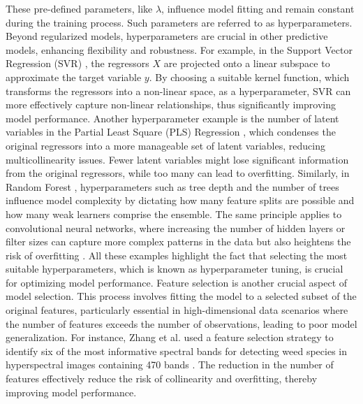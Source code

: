 These pre-defined parameters, like $\lambda$, influence model fitting and remain constant during the training process. Such parameters are referred to as hyperparameters. Beyond regularized models, hyperparameters are crucial in other predictive models, enhancing flexibility and robustness. For example, in the Support Vector Regression (SVR) \citep{drucker_support_1996}, the regressors $X$ are projected onto a linear subspace to approximate the target variable $y$. By choosing a suitable kernel function, which transforms the regressors into a non-linear space, as a hyperparameter, SVR can more effectively capture non-linear relationships, thus significantly improving model performance. Another hyperparameter example is the number of latent variables in the Partial Least Square (PLS) Regression \citep{abdi_partial_2003}, which condenses the original regressors into a more manageable set of latent variables, reducing multicollinearity issues. Fewer latent variables might lose significant information from the original regressors, while too many can lead to overfitting. Similarly, in Random Forest \citep{breiman_random_2001}, hyperparameters such as tree depth and the number of trees influence model complexity by dictating how many feature splits are possible and how many weak learners comprise the ensemble. The same principle applies to convolutional neural networks, where increasing the number of hidden layers or filter sizes can capture more complex patterns in the data but also heightens the risk of overfitting \citep{lecun_generalization_1989}. All these examples highlight the fact that selecting the most suitable hyperparameters, which is known as hyperparameter tuning, is crucial for optimizing model performance.
Feature selection is another crucial aspect of model selection. This process involves fitting the model to a selected subset of the original features, particularly essential in high-dimensional data scenarios where the number of features exceeds the number of observations, leading to poor model generalization. For instance, Zhang et al. used a feature selection strategy to identify six of 
the most informative spectral bands for detecting weed species in hyperspectral images containing 470 bands \citep{zhang_automated_2019}. The reduction in the number of features effectively reduce the risk of collinearity and overfitting, thereby improving model performance. 

